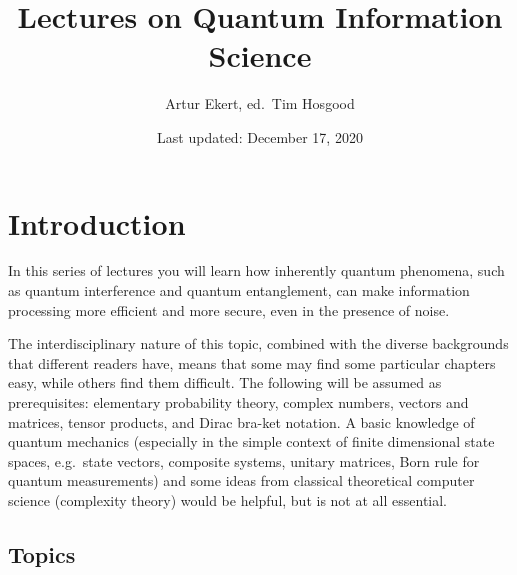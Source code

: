 \documentclass{article}
\title{Lectures on Quantum Information Science}
\author{Artur Ekert, ed.~Tim Hosgood}
\date{Last updated: December 17, 2020}
\begin{document}
\setcounter{tocdepth}{2}
\tableofcontents

\providecommand{\xmapsto}[1]{\overset{#1}{\longmapsto}}
\providecommand{\bra}[1]{\langle#1|}
\providecommand{\ket}[1]{|#1\rangle}
\providecommand{\braket}[1]{\langle#1\rangle}
\providecommand{\proj}[1]{|#1\rangle\langle#1|}
\providecommand{\av}[1]{\braket{#1}}
\providecommand{\tr}{\operatorname{tr}}
\providecommand{\id}{\operatorname{id}}
\providecommand{\diag}[2]{\begin{bmatrix}#1&0\\0&#2\end{bmatrix}}

\hypertarget{introduction}{%
\section*{Introduction}\label{introduction}}

In this series of lectures you will learn how inherently quantum phenomena, such as quantum interference and quantum entanglement, can make information processing more efficient and more secure, even in the presence of noise.

The interdisciplinary nature of this topic, combined with the diverse backgrounds that different readers have, means that some may find some particular chapters easy, while others find them difficult.
The following will be assumed as prerequisites: elementary probability theory, complex numbers, vectors and matrices, tensor products, and Dirac bra-ket notation.
A basic knowledge of quantum mechanics (especially in the simple context of finite dimensional state spaces, e.g.~state vectors, composite systems, unitary matrices, Born rule for quantum measurements) and some ideas from classical theoretical computer science (complexity theory) would be helpful, but is not at all essential.

\hypertarget{topics}{%
\subsection*{Topics}\label{topics}}
\end{document}
